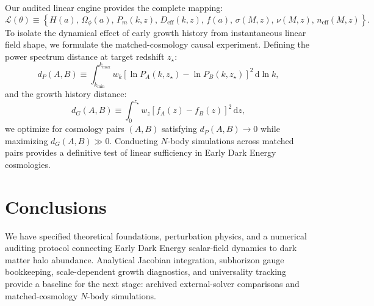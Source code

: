 \documentclass[11pt]{article}
\newcommand{\dd}{\,\mathrm d}
\begin{document}
Our audited linear engine provides the complete mapping:
\begin{equation}
\mathcal L(\theta) \equiv \left\{ H(a),\, \Omega_\phi(a),\, P_m(k, z),\, D_{\mathrm{eff}}(k, z),\, f(a),\, \sigma(M, z),\, \nu(M, z),\, n_{\mathrm{eff}}(M, z) \right\}.
\end{equation}
To isolate the dynamical effect of early growth history from instantaneous linear field shape, we formulate the matched-cosmology causal experiment. Defining the power spectrum distance at target redshift $z_\star$:
\begin{equation}
d_P(A, B) \equiv \int_{k_{\mathrm{min}}}^{k_{\mathrm{max}}} w_k \left[ \ln P_A(k, z_\star) - \ln P_B(k, z_\star) \right]^2 \dd\ln k,
\end{equation}
and the growth history distance:
\begin{equation}
d_G(A, B) \equiv \int_0^{z_\star} w_z \left[ f_A(z) - f_B(z) \right]^2 \dd z,
\end{equation}
we optimize for cosmology pairs $(A, B)$ satisfying $d_P(A, B) \to 0$ while maximizing $d_G(A, B) \gg 0$. Conducting $N$-body simulations across matched pairs provides a definitive test of linear sufficiency in Early Dark Energy cosmologies.

\section{Conclusions}
\label{sec:conclusions}

We have specified theoretical foundations, perturbation physics, and a numerical auditing protocol connecting Early Dark Energy scalar-field dynamics to dark matter halo abundance. Analytical Jacobian integration, subhorizon gauge bookkeeping, scale-dependent growth diagnostics, and universality tracking provide a baseline for the next stage: archived external-solver comparisons and matched-cosmology $N$-body simulations.



\end{document}
